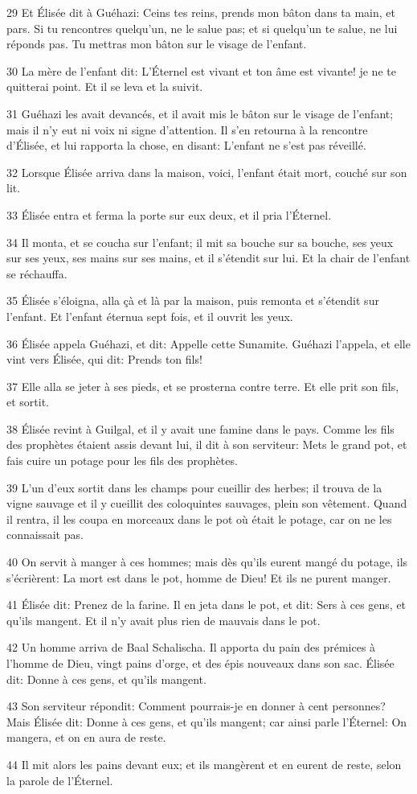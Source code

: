 \par 29 Et Élisée dit à Guéhazi: Ceins tes reins, prends mon bâton dans ta main, et pars. Si tu rencontres quelqu'un, ne le salue pas; et si quelqu'un te salue, ne lui réponds pas. Tu mettras mon bâton sur le visage de l'enfant.
\par 30 La mère de l'enfant dit: L'Éternel est vivant et ton âme est vivante! je ne te quitterai point. Et il se leva et la suivit.
\par 31 Guéhazi les avait devancés, et il avait mis le bâton sur le visage de l'enfant; mais il n'y eut ni voix ni signe d'attention. Il s'en retourna à la rencontre d'Élisée, et lui rapporta la chose, en disant: L'enfant ne s'est pas réveillé.
\par 32 Lorsque Élisée arriva dans la maison, voici, l'enfant était mort, couché sur son lit.
\par 33 Élisée entra et ferma la porte sur eux deux, et il pria l'Éternel.
\par 34 Il monta, et se coucha sur l'enfant; il mit sa bouche sur sa bouche, ses yeux sur ses yeux, ses mains sur ses mains, et il s'étendit sur lui. Et la chair de l'enfant se réchauffa.
\par 35 Élisée s'éloigna, alla çà et là par la maison, puis remonta et s'étendit sur l'enfant. Et l'enfant éternua sept fois, et il ouvrit les yeux.
\par 36 Élisée appela Guéhazi, et dit: Appelle cette Sunamite. Guéhazi l'appela, et elle vint vers Élisée, qui dit: Prends ton fils!
\par 37 Elle alla se jeter à ses pieds, et se prosterna contre terre. Et elle prit son fils, et sortit.
\par 38 Élisée revint à Guilgal, et il y avait une famine dans le pays. Comme les fils des prophètes étaient assis devant lui, il dit à son serviteur: Mets le grand pot, et fais cuire un potage pour les fils des prophètes.
\par 39 L'un d'eux sortit dans les champs pour cueillir des herbes; il trouva de la vigne sauvage et il y cueillit des coloquintes sauvages, plein son vêtement. Quand il rentra, il les coupa en morceaux dans le pot où était le potage, car on ne les connaissait pas.
\par 40 On servit à manger à ces hommes; mais dès qu'ils eurent mangé du potage, ils s'écrièrent: La mort est dans le pot, homme de Dieu! Et ils ne purent manger.
\par 41 Élisée dit: Prenez de la farine. Il en jeta dans le pot, et dit: Sers à ces gens, et qu'ils mangent. Et il n'y avait plus rien de mauvais dans le pot.
\par 42 Un homme arriva de Baal Schalischa. Il apporta du pain des prémices à l'homme de Dieu, vingt pains d'orge, et des épis nouveaux dans son sac. Élisée dit: Donne à ces gens, et qu'ils mangent.
\par 43 Son serviteur répondit: Comment pourrais-je en donner à cent personnes? Mais Élisée dit: Donne à ces gens, et qu'ils mangent; car ainsi parle l'Éternel: On mangera, et on en aura de reste.
\par 44 Il mit alors les pains devant eux; et ils mangèrent et en eurent de reste, selon la parole de l'Éternel.

